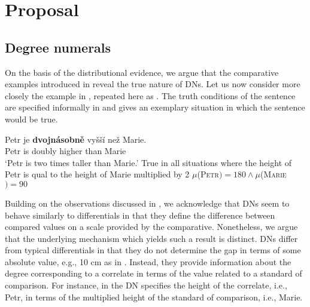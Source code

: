 \documentclass[output=paper,modfonts,hidelinks,newtxmath
\ChapterDOI{10.5281/zenodo.2545513}
]{langscibook}
\begin{document}
\section{Proposal}\label{proposal}

\subsection{Degree numerals}\label{degree-numerals}

On the basis of the distributional evidence, we argue that the comparative examples introduced in  reveal the true nature of DNs. Let us now consider more closely the example in , repeated here as . The truth conditions of the sentence are specified informally in  and  gives an exemplary situation in which the sentence would be true.

\ea\label{comp-ex} \gll Petr je \textbf{dvojnásobně} vyšší než Marie.\\
Petr is doubly higher than Marie\\
\glt `Petr is two times taller than Marie.'
\ea True in all situations where the height of Petr is qual to the height of Marie multiplied by 2\label{comp-ex-int-a} 
\ex $\mu$(\textsc{Petr}$) = 180 \wedge \mu$(\textsc{Marie}$) = 90$\label{comp-ex-int-b}
\z \z

\noindent Building on the observations discussed in , we acknowledge that DNs seem to behave similarly to differentials in that they define the difference between compared values on a scale provided by the comparative. Nonetheless, we argue that the underlying mechanism which yields such a result is distinct. DNs differ from typical differentials in that they do not determine the gap in terms of some absolute value, e.g., 10 cm as in . Instead, they provide information about the degree corresponding to a correlate in terms of the value related to a standard of comparison. For instance, in  the DN specifies the height of the correlate, i.e., Petr, in terms of the multiplied height of the standard of comparison, i.e., Marie.
\end{document}

